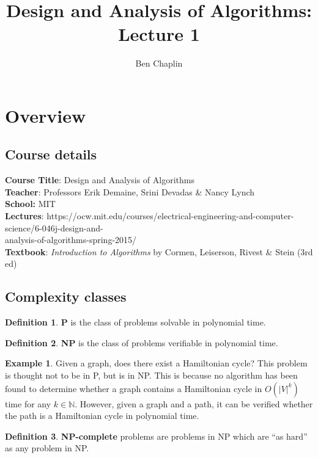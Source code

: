 \documentclass[11pt]{article}
\title{Design and Analysis of Algorithms: Lecture 1}
\author{Ben Chaplin}
\date{}
\theoremstyle{plain}
\theoremstyle{definition}
\newtheorem*{defn}{Definition}
\newtheorem*{ex}{Example}
\newcommand{\N}{\mathbb{N}}
\begin{document}
\maketitle
\tableofcontents

\section{Overview}
\subsection{Course details}

{\bf Course Title}: Design and Analysis of Algorithms\\
{\bf Teacher}: Professors Erik Demaine, Srini Devadas \& Nancy Lynch\\
{\bf School:} MIT\\ 
{\bf Lectures}: https://ocw.mit.edu/courses/electrical-engineering-and-computer-science/6-046j-design-and-\\
analysis-of-algorithms-spring-2015/\\
{\bf Textbook}: {\it Introduction to Algorithms} by Cormen, Leiserson, Rivest \& Stein (3rd ed) 

\subsection{Complexity classes}

\begin{defn}
    {\bf P} is the class of problems solvable in polynomial time.
\end{defn}

\begin{defn}
    {\bf NP} is the class of problems verifiable in polynomial time.
\end{defn}

\begin{ex}
    Given a graph, does there exist a Hamiltonian cycle? This problem is thought not to be in P,
    but is in NP. This is because no algorithm has been found to determine whether a graph contains a Hamiltonian
    cycle in $O(|V|^k)$ time for any $k \in \N$. However, given a graph and a path, it can be verified
    whether the path is a Hamiltonian cycle in polynomial time.
\end{ex}

\begin{defn}
    {\bf NP-complete} problems are problems in NP which are ``as hard'' as any problem in NP.
\end{defn}
\end{document}
